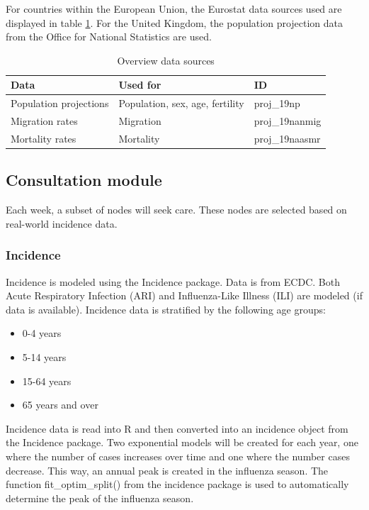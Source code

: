 \documentclass[
]{article}
\begin{document}
For countries within the European Union, the Eurostat \autocite{europeancommissionEurostat} data sources used are displayed in table \ref{tab:data-eurostatpop}. For the United Kingdom, the population projection data from the Office for National Statistics are used.

\begin{table}

\caption{\label{tab:data-eurostatpop}Overview data sources}
\centering
\begin{tabular}[t]{l|l|l}
\hline
Data & Used for & ID\\
\hline
Population projections & Population, sex, age, fertility & proj\_19np\\
\hline
Migration rates & Migration & proj\_19nanmig\\
\hline
Mortality rates & Mortality & proj\_19naasmr\\
\hline
\end{tabular}
\end{table}

\hypertarget{consulation_model}{%
\subsection{Consultation module}\label{consulation_model}}

Each week, a subset of nodes will seek care. These nodes are selected based on real-world incidence data.

\hypertarget{incidence}{%
\subsubsection{Incidence}\label{incidence}}

Incidence is modeled using the Incidence package. Data is from ECDC. Both Acute Respiratory Infection (ARI) and Influenza-Like Illness (ILI) are modeled (if data is available). Incidence data is stratified by the following age groups:

\begin{itemize}
\item
  0-4 years
\item
  5-14 years
\item
  15-64 years
\item
  65 years and over
\end{itemize}

Incidence data is read into R and then converted into an incidence object from the Incidence package. Two exponential models will be created for each year, one where the number of cases increases over time and one where the number cases decrease. This way, an annual peak is created in the influenza season. The function fit\_optim\_split() from the incidence package is used to automatically determine the peak of the influenza season.
\end{document}
